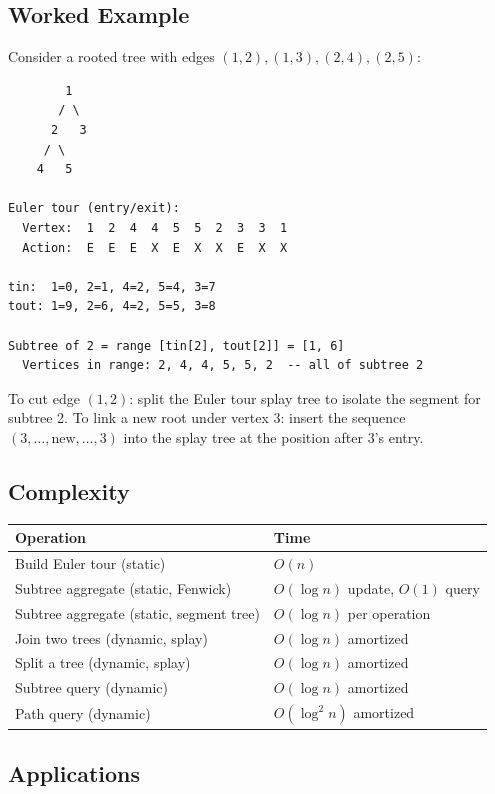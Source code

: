 \subsection{Worked Example}

Consider a rooted tree with edges $(1,2), (1,3), (2,4), (2,5)$:

\begin{lstlisting}
        1
       / \
      2   3
     / \
    4   5

Euler tour (entry/exit):
  Vertex:  1  2  4  4  5  5  2  3  3  1
  Action:  E  E  E  X  E  X  X  E  X  X

tin:  1=0, 2=1, 4=2, 5=4, 3=7
tout: 1=9, 2=6, 4=2, 5=5, 3=8

Subtree of 2 = range [tin[2], tout[2]] = [1, 6]
  Vertices in range: 2, 4, 4, 5, 5, 2  -- all of subtree 2
\end{lstlisting}

To cut edge $(1, 2)$: split the Euler tour splay tree to isolate the segment for subtree 2. To link a new root under vertex 3: insert the sequence $(3, \ldots, \text{new}, \ldots, 3)$ into the splay tree at the position after $3$'s entry.

\subsection{Complexity}

\begin{center}
\begin{tabular}{ll}
\toprule
Operation & Time \\
\midrule
Build Euler tour (static) & $O(n)$ \\
Subtree aggregate (static, Fenwick) & $O(\log n)$ update, $O(1)$ query \\
Subtree aggregate (static, segment tree) & $O(\log n)$ per operation \\
Join two trees (dynamic, splay) & $O(\log n)$ amortized \\
Split a tree (dynamic, splay) & $O(\log n)$ amortized \\
Subtree query (dynamic) & $O(\log n)$ amortized \\
Path query (dynamic) & $O(\log^2 n)$ amortized \\
\bottomrule
\end{tabular}
\end{center}

\subsection{Applications}

